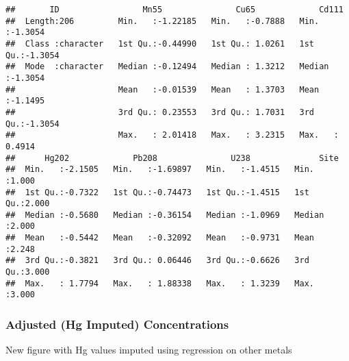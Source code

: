 \documentclass[]{article}
\newenvironment{Shaded}{\begin{snugshade}}{\end{snugshade}}
\newcommand{\CommentTok}[1]{\textcolor[rgb]{0.56,0.35,0.01}{\textit{#1}}}
\newcommand{\DataTypeTok}[1]{\textcolor[rgb]{0.13,0.29,0.53}{#1}}
\newcommand{\KeywordTok}[1]{\textcolor[rgb]{0.13,0.29,0.53}{\textbf{#1}}}
\newcommand{\NormalTok}[1]{#1}
\newcommand{\OperatorTok}[1]{\textcolor[rgb]{0.81,0.36,0.00}{\textbf{#1}}}
\newcommand{\StringTok}[1]{\textcolor[rgb]{0.31,0.60,0.02}{#1}}
\begin{document}
\begin{verbatim}
##       ID                 Mn55               Cu65             Cd111        
##  Length:206         Min.   :-1.22185   Min.   :-0.7888   Min.   :-1.3054  
##  Class :character   1st Qu.:-0.44990   1st Qu.: 1.0261   1st Qu.:-1.3054  
##  Mode  :character   Median :-0.12494   Median : 1.3212   Median :-1.3054  
##                     Mean   :-0.01539   Mean   : 1.3703   Mean   :-1.1495  
##                     3rd Qu.: 0.23553   3rd Qu.: 1.7031   3rd Qu.:-1.3054  
##                     Max.   : 2.01418   Max.   : 3.2315   Max.   : 0.4914  
##      Hg202             Pb208               U238              Site      
##  Min.   :-2.1505   Min.   :-1.69897   Min.   :-1.4515   Min.   :1.000  
##  1st Qu.:-0.7322   1st Qu.:-0.74473   1st Qu.:-1.4515   1st Qu.:2.000  
##  Median :-0.5680   Median :-0.36154   Median :-1.0969   Median :2.000  
##  Mean   :-0.5442   Mean   :-0.32092   Mean   :-0.9731   Mean   :2.248  
##  3rd Qu.:-0.3821   3rd Qu.: 0.06446   3rd Qu.:-0.6626   3rd Qu.:3.000  
##  Max.   : 1.7794   Max.   : 1.88338   Max.   : 1.3239   Max.   :3.000
\end{verbatim}

\hypertarget{adjusted-hg-imputed-concentrations}{%
\subsubsection{Adjusted (Hg Imputed)
Concentrations}\label{adjusted-hg-imputed-concentrations}}

New figure with Hg values imputed using regression on other metals

\begin{Shaded}
\end{Shaded}
\end{document}
